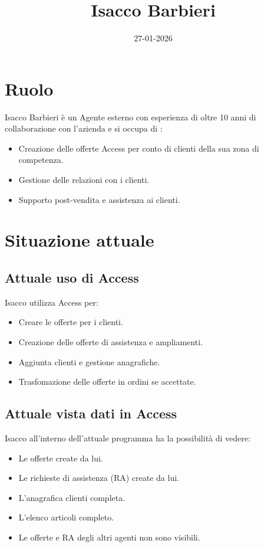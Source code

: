 \documentclass[12pt, a4paper]{article} %
\title{Isacco Barbieri}
\date{27-01-2026}
\begin{document}
\maketitle

\section{Ruolo}
Isacco Barbieri è un Agente esterno con esperienza di oltre 10 anni di
collaborazione con l'azienda e si occupa di :
\begin{itemize}
      \item Creazione delle offerte Access per conto di clienti della sua zona di
            competenza.
      \item Gestione delle relazioni con i clienti.
      \item Supporto post-vendita e assistenza ai clienti.
\end{itemize}

\section{Situazione attuale}
\subsection{Attuale uso di Access}
Isacco utilizza Access per:
\begin{itemize}
      \item Creare le offerte per i clienti.
      \item Creazione delle offerte di assistenza e ampliamenti.
      \item Aggiunta clienti e gestione anagrafiche.
      \item Trasfomazione delle offerte in ordini se accettate.
\end{itemize}

\subsection{Attuale vista dati in Access}
Isacco all'interno dell'attuale programma ha la possibilità di vedere:
\begin{itemize}
      \item Le offerte create da lui.
      \item Le richieste di assistenza (RA) create da lui.
      \item L'anagrafica clienti completa.
      \item L'elenco articoli completo.
      \item Le offerte e RA degli altri agenti non sono visibili.
\end{itemize}
\end{document}
